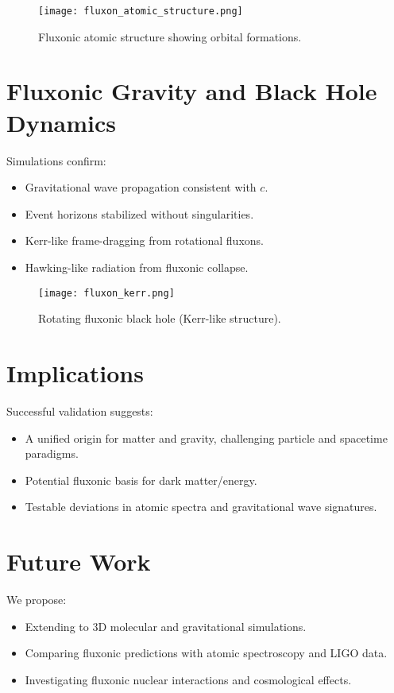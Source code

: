 \documentclass{article}
\begin{document}
\begin{figure}[h]
    \centering
    \texttt{[image: fluxon\_atomic\_structure.png]}
    \caption{Fluxonic atomic structure showing orbital formations.}
    \label{fig:atomic}
\end{figure}

\section{Fluxonic Gravity and Black Hole Dynamics}
Simulations confirm:
\begin{itemize}
    \item Gravitational wave propagation consistent with \(c\).
    \item Event horizons stabilized without singularities.
    \item Kerr-like frame-dragging from rotational fluxons.
    \item Hawking-like radiation from fluxonic collapse.
\end{itemize}

\begin{figure}[h]
    \centering
    \texttt{[image: fluxon\_kerr.png]}
    \caption{Rotating fluxonic black hole (Kerr-like structure).}
    \label{fig:kerr}
\end{figure}

\section{Implications}
Successful validation suggests:
\begin{itemize}
    \item A unified origin for matter and gravity, challenging particle and spacetime paradigms.
    \item Potential fluxonic basis for dark matter/energy.
    \item Testable deviations in atomic spectra and gravitational wave signatures.
\end{itemize}

\section{Future Work}
We propose:
\begin{itemize}
    \item Extending to 3D molecular and gravitational simulations.
    \item Comparing fluxonic predictions with atomic spectroscopy and LIGO data.
    \item Investigating fluxonic nuclear interactions and cosmological effects.
\end{itemize}
\end{document}
